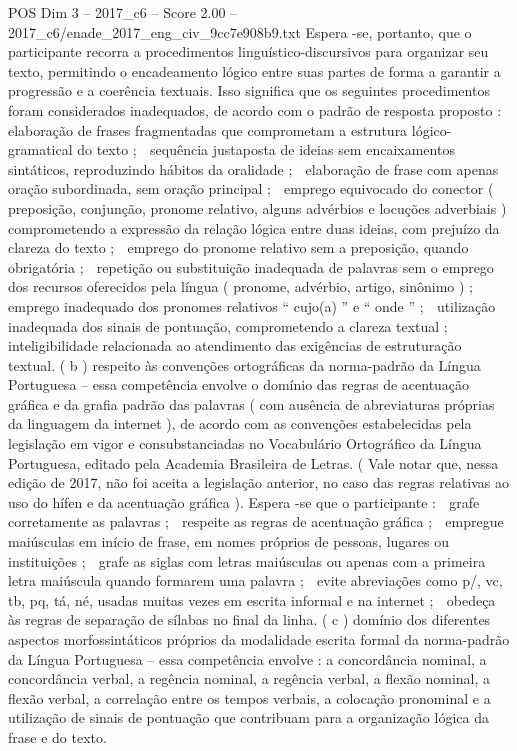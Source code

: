 \begin{textsample}{POS Dim 3 – 2017\_c6 – Score 2.00 – 2017\_c6/enade\_2017\_eng\_civ\_9cc7e908b9.txt}
Espera -se, portanto, que o participante recorra a procedimentos linguístico-discursivos para organizar seu texto, permitindo o encadeamento lógico entre suas partes de forma a garantir a progressão e a coerência textuais.
Isso significa que os seguintes procedimentos foram considerados inadequados, de acordo com o padrão de resposta proposto :  elaboração de frases fragmentadas que comprometam a estrutura lógico-gramatical do texto ;  sequência justaposta de ideias sem encaixamentos sintáticos, reproduzindo hábitos da oralidade ;  elaboração de frase com apenas oração subordinada, sem oração principal ;  emprego equivocado do conector ( preposição, conjunção, pronome relativo, alguns advérbios e locuções adverbiais ) comprometendo a expressão da relação lógica entre duas ideias, com prejuízo da clareza do texto ;  emprego do pronome relativo sem a preposição, quando obrigatória ;  repetição ou substituição inadequada de palavras sem o emprego dos recursos oferecidos pela língua ( pronome, advérbio, artigo, sinônimo ) ;  emprego inadequado dos pronomes relativos “ cujo(a) ” e “ onde ” ;  utilização inadequada dos sinais de pontuação, comprometendo a clareza textual ;  inteligibilidade relacionada ao atendimento das exigências de estruturação textual. ( b ) respeito às convenções ortográficas da norma-padrão da Língua Portuguesa – essa competência envolve o domínio das regras de acentuação gráfica e da grafia padrão das palavras ( com ausência de abreviaturas próprias da linguagem da internet ), de acordo com as convenções estabelecidas pela legislação em vigor e consubstanciadas no Vocabulário Ortográfico da Língua Portuguesa, editado pela Academia Brasileira de Letras. ( Vale notar que, nessa edição de 2017, não foi aceita a legislação anterior, no caso das regras relativas ao uso do hífen e da acentuação gráfica ).
Espera -se que o participante :  grafe corretamente as palavras ;  respeite as regras de acentuação gráfica ;  empregue maiúsculas em início de frase, em nomes próprios de pessoas, lugares ou instituições ;  grafe as siglas com letras maiúsculas ou apenas com a primeira letra maiúscula quando formarem uma palavra ;  evite abreviações como p/, vc, tb, pq, tá, né, usadas muitas vezes em escrita informal e na internet ;  obedeça às regras de separação de sílabas no final da linha. ( c ) domínio dos diferentes aspectos morfossintáticos próprios da modalidade escrita formal da norma-padrão da Língua Portuguesa – essa competência envolve : a concordância nominal, a concordância verbal, a regência nominal, a regência verbal, a flexão nominal, a flexão verbal, a correlação entre os tempos verbais, a colocação pronominal e a utilização de sinais de pontuação que contribuam para a organização lógica da frase e do texto.

\end{textsample}

